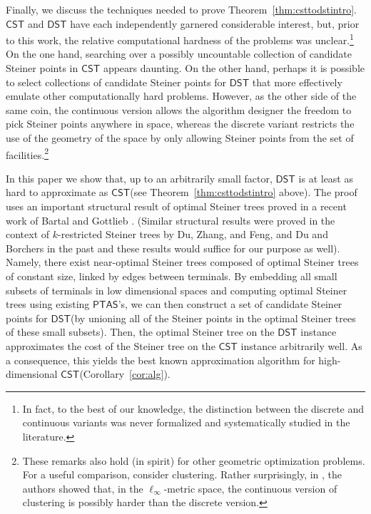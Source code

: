 \documentclass{theoretics}
\newcommand{\1}{\textbf{1}}
\newcommand{\cst}{$\mathsf{CST}$\xspace}
\newcommand{\dst}{$\mathsf{DST}$\xspace}
\newcommand{\ptas}{$\mathsf{PTAS}$\xspace}
\begin{document}
Finally, we discuss the techniques needed to prove Theorem~\ref{thm:csttodstintro}. 
\cst and \dst have each independently garnered considerable interest, but, prior to this work, the relative computational hardness of the problems was unclear.\footnote{In fact, to the best of our knowledge, the distinction between the discrete and continuous variants was never formalized and systematically studied in the literature.} On the one hand, searching over a possibly uncountable collection of candidate Steiner points in \cst appears daunting. On the other hand, perhaps it is possible to select collections of candidate Steiner points for \dst that more effectively emulate other computationally hard problems. However, as the other side of the same coin, the continuous version allows the algorithm designer the freedom to pick Steiner points anywhere in space, whereas the discrete variant restricts the use of the  geometry of the space by only allowing Steiner points from the set of facilities.\footnote{These remarks also hold (in spirit) for other geometric optimization problems. For a useful comparison, consider clustering. Rather surprisingly, in \cite{CKL21}, the authors showed that, in the $\ell_\infty$-metric space, the continuous version of clustering is possibly harder than the discrete version. }

In this paper we show that, up to an arbitrarily small factor, \dst is at least as hard to approximate as \cst (see Theorem~\ref{thm:csttodstintro} above). The proof uses an important structural result of optimal Steiner trees proved in a recent work of Bartal and Gottlieb \cite{Bartal_Gottlieb_2021}. (Similar structural results were proved in the context of $k$-restricted Steiner trees by Du, Zhang, and Feng, and Du and Borchers \cite{DuZhangFeng91, Borchers97} in the past and these results would suffice for our purpose as well). Namely, there exist near-optimal Steiner trees composed of optimal Steiner trees of constant size, linked by edges between terminals. By embedding all small subsets of terminals in low dimensional spaces and computing optimal Steiner trees using existing \ptas's, we can then construct a set of candidate Steiner points for \dst (by unioning all of the Steiner points in the optimal Steiner trees of these small subsets). Then, the optimal Steiner tree on the \dst instance approximates the cost of the Steiner tree on the \cst instance arbitrarily well. As a consequence, this yields the best known approximation algorithm for high-dimensional \cst (Corollary~\ref{cor:alg}). 
\end{document}
